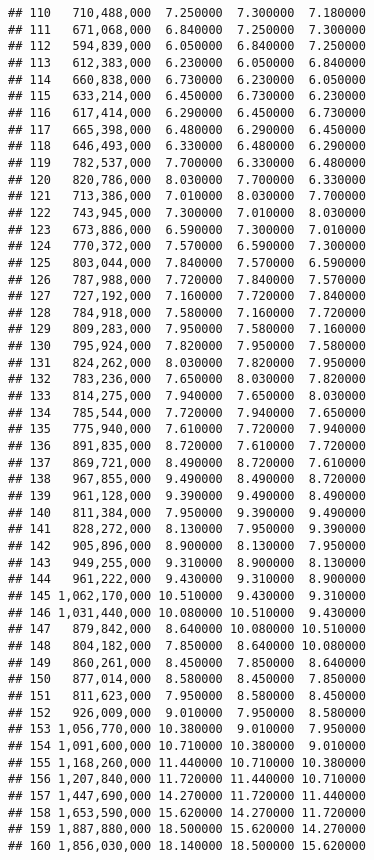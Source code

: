 \documentclass[]{article}
\begin{document}
\begin{verbatim}
## 110   710,488,000  7.250000  7.300000  7.180000
## 111   671,068,000  6.840000  7.250000  7.300000
## 112   594,839,000  6.050000  6.840000  7.250000
## 113   612,383,000  6.230000  6.050000  6.840000
## 114   660,838,000  6.730000  6.230000  6.050000
## 115   633,214,000  6.450000  6.730000  6.230000
## 116   617,414,000  6.290000  6.450000  6.730000
## 117   665,398,000  6.480000  6.290000  6.450000
## 118   646,493,000  6.330000  6.480000  6.290000
## 119   782,537,000  7.700000  6.330000  6.480000
## 120   820,786,000  8.030000  7.700000  6.330000
## 121   713,386,000  7.010000  8.030000  7.700000
## 122   743,945,000  7.300000  7.010000  8.030000
## 123   673,886,000  6.590000  7.300000  7.010000
## 124   770,372,000  7.570000  6.590000  7.300000
## 125   803,044,000  7.840000  7.570000  6.590000
## 126   787,988,000  7.720000  7.840000  7.570000
## 127   727,192,000  7.160000  7.720000  7.840000
## 128   784,918,000  7.580000  7.160000  7.720000
## 129   809,283,000  7.950000  7.580000  7.160000
## 130   795,924,000  7.820000  7.950000  7.580000
## 131   824,262,000  8.030000  7.820000  7.950000
## 132   783,236,000  7.650000  8.030000  7.820000
## 133   814,275,000  7.940000  7.650000  8.030000
## 134   785,544,000  7.720000  7.940000  7.650000
## 135   775,940,000  7.610000  7.720000  7.940000
## 136   891,835,000  8.720000  7.610000  7.720000
## 137   869,721,000  8.490000  8.720000  7.610000
## 138   967,855,000  9.490000  8.490000  8.720000
## 139   961,128,000  9.390000  9.490000  8.490000
## 140   811,384,000  7.950000  9.390000  9.490000
## 141   828,272,000  8.130000  7.950000  9.390000
## 142   905,896,000  8.900000  8.130000  7.950000
## 143   949,255,000  9.310000  8.900000  8.130000
## 144   961,222,000  9.430000  9.310000  8.900000
## 145 1,062,170,000 10.510000  9.430000  9.310000
## 146 1,031,440,000 10.080000 10.510000  9.430000
## 147   879,842,000  8.640000 10.080000 10.510000
## 148   804,182,000  7.850000  8.640000 10.080000
## 149   860,261,000  8.450000  7.850000  8.640000
## 150   877,014,000  8.580000  8.450000  7.850000
## 151   811,623,000  7.950000  8.580000  8.450000
## 152   926,009,000  9.010000  7.950000  8.580000
## 153 1,056,770,000 10.380000  9.010000  7.950000
## 154 1,091,600,000 10.710000 10.380000  9.010000
## 155 1,168,260,000 11.440000 10.710000 10.380000
## 156 1,207,840,000 11.720000 11.440000 10.710000
## 157 1,447,690,000 14.270000 11.720000 11.440000
## 158 1,653,590,000 15.620000 14.270000 11.720000
## 159 1,887,880,000 18.500000 15.620000 14.270000
## 160 1,856,030,000 18.140000 18.500000 15.620000

\end{verbatim}
\end{document}
